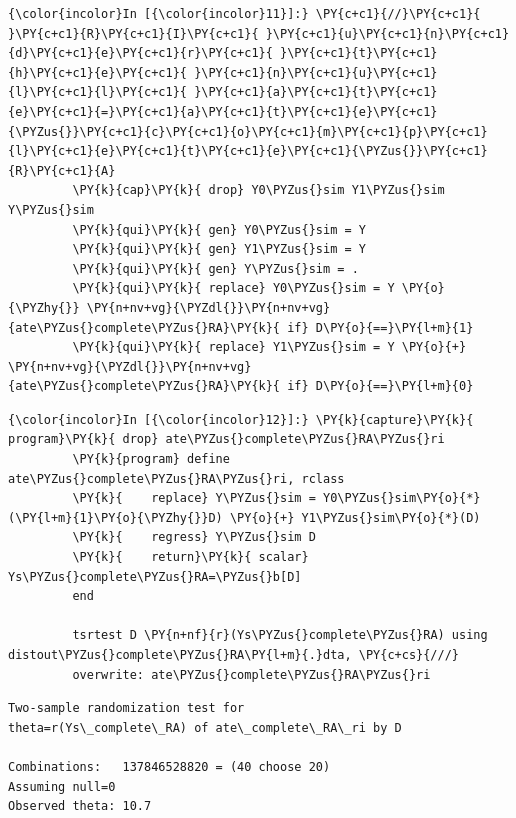 \documentclass[11pt,notitlepage]{article}\usepackage[]{graphicx}\usepackage[]{color}
\makeatletter
\newenvironment{kframe}{%
 \def\at@end@of@kframe{}%
 \ifinner\ifhmode%
  \def\at@end@of@kframe{\end{minipage}}%
  \begin{minipage}{\columnwidth}%
 \fi\fi%
 \def\FrameCommand##1{\hskip\@totalleftmargin \hskip-\fboxsep
 \colorbox{shadecolor}{##1}\hskip-\fboxsep
     \hskip-\linewidth \hskip-\@totalleftmargin \hskip\columnwidth}%
 \MakeFramed {\advance\hsize-\width
   \@totalleftmargin\z@ \linewidth\hsize
   \@setminipage}}%
 {\par\unskip\endMakeFramed%
 \at@end@of@kframe}
\newenvironment{knitrout}{}{} %
\makeatother
\begin{document}
\begin{enumerate}[a)]
\begin{knitrout}
\begin{kframe}
    \begin{Verbatim}[commandchars=\\\{\}]
{\color{incolor}In [{\color{incolor}11}]:} \PY{c+c1}{//}\PY{c+c1}{ }\PY{c+c1}{R}\PY{c+c1}{I}\PY{c+c1}{ }\PY{c+c1}{u}\PY{c+c1}{n}\PY{c+c1}{d}\PY{c+c1}{e}\PY{c+c1}{r}\PY{c+c1}{ }\PY{c+c1}{t}\PY{c+c1}{h}\PY{c+c1}{e}\PY{c+c1}{ }\PY{c+c1}{n}\PY{c+c1}{u}\PY{c+c1}{l}\PY{c+c1}{l}\PY{c+c1}{ }\PY{c+c1}{a}\PY{c+c1}{t}\PY{c+c1}{e}\PY{c+c1}{=}\PY{c+c1}{a}\PY{c+c1}{t}\PY{c+c1}{e}\PY{c+c1}{\PYZus{}}\PY{c+c1}{c}\PY{c+c1}{o}\PY{c+c1}{m}\PY{c+c1}{p}\PY{c+c1}{l}\PY{c+c1}{e}\PY{c+c1}{t}\PY{c+c1}{e}\PY{c+c1}{\PYZus{}}\PY{c+c1}{R}\PY{c+c1}{A}
         \PY{k}{cap}\PY{k}{ drop} Y0\PYZus{}sim Y1\PYZus{}sim Y\PYZus{}sim
         \PY{k}{qui}\PY{k}{ gen} Y0\PYZus{}sim = Y
         \PY{k}{qui}\PY{k}{ gen} Y1\PYZus{}sim = Y
         \PY{k}{qui}\PY{k}{ gen} Y\PYZus{}sim = .
         \PY{k}{qui}\PY{k}{ replace} Y0\PYZus{}sim = Y \PY{o}{\PYZhy{}} \PY{n+nv+vg}{\PYZdl{}}\PY{n+nv+vg}{ate\PYZus{}complete\PYZus{}RA}\PY{k}{ if} D\PY{o}{==}\PY{l+m}{1}
         \PY{k}{qui}\PY{k}{ replace} Y1\PYZus{}sim = Y \PY{o}{+} \PY{n+nv+vg}{\PYZdl{}}\PY{n+nv+vg}{ate\PYZus{}complete\PYZus{}RA}\PY{k}{ if} D\PY{o}{==}\PY{l+m}{0}
\end{Verbatim}

    \begin{Verbatim}[commandchars=\\\{\}]
{\color{incolor}In [{\color{incolor}12}]:} \PY{k}{capture}\PY{k}{ program}\PY{k}{ drop} ate\PYZus{}complete\PYZus{}RA\PYZus{}ri
         \PY{k}{program} define ate\PYZus{}complete\PYZus{}RA\PYZus{}ri, rclass
         \PY{k}{	replace} Y\PYZus{}sim = Y0\PYZus{}sim\PY{o}{*}(\PY{l+m}{1}\PY{o}{\PYZhy{}}D) \PY{o}{+} Y1\PYZus{}sim\PY{o}{*}(D) 
         \PY{k}{	regress} Y\PYZus{}sim D 
         \PY{k}{    return}\PY{k}{ scalar} Ys\PYZus{}complete\PYZus{}RA=\PYZus{}b[D]	
         end
         
         tsrtest D \PY{n+nf}{r}(Ys\PYZus{}complete\PYZus{}RA) using distout\PYZus{}complete\PYZus{}RA\PY{l+m}{.}dta, \PY{c+cs}{///}
         overwrite: ate\PYZus{}complete\PYZus{}RA\PYZus{}ri
\end{Verbatim}

    \begin{Verbatim}[commandchars=\\\{\}]
Two-sample randomization test for 
theta=r(Ys\_complete\_RA) of ate\_complete\_RA\_ri by D

Combinations:   137846528820 = (40 choose 20)
Assuming null=0
Observed theta: 10.7


\end{Verbatim}
\end{kframe}
\end{knitrout}
\end{enumerate}
\end{document}
